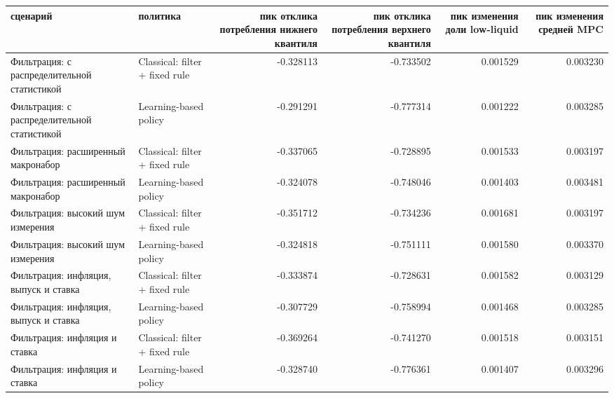 \begin{tabular}{llrrrr}
\toprule
сценарий & политика & пик отклика потребления нижнего квантиля & пик отклика потребления верхнего квантиля & пик изменения доли low-liquid & пик изменения средней MPC \\
\midrule
Фильтрация: с распределительной статистикой & Classical: filter + fixed rule & -0.328113 & -0.733502 & 0.001529 & 0.003230 \\
Фильтрация: с распределительной статистикой & Learning-based policy & -0.291291 & -0.777314 & 0.001222 & 0.003285 \\
Фильтрация: расширенный макронабор & Classical: filter + fixed rule & -0.337065 & -0.728895 & 0.001533 & 0.003197 \\
Фильтрация: расширенный макронабор & Learning-based policy & -0.324078 & -0.748046 & 0.001403 & 0.003481 \\
Фильтрация: высокий шум измерения & Classical: filter + fixed rule & -0.351712 & -0.734236 & 0.001681 & 0.003197 \\
Фильтрация: высокий шум измерения & Learning-based policy & -0.324818 & -0.751111 & 0.001580 & 0.003370 \\
Фильтрация: инфляция, выпуск и ставка & Classical: filter + fixed rule & -0.333874 & -0.728631 & 0.001582 & 0.003129 \\
Фильтрация: инфляция, выпуск и ставка & Learning-based policy & -0.307729 & -0.758994 & 0.001468 & 0.003285 \\
Фильтрация: инфляция и ставка & Classical: filter + fixed rule & -0.369264 & -0.741270 & 0.001518 & 0.003151 \\
Фильтрация: инфляция и ставка & Learning-based policy & -0.328740 & -0.776361 & 0.001407 & 0.003296 \\
\bottomrule
\end{tabular}
